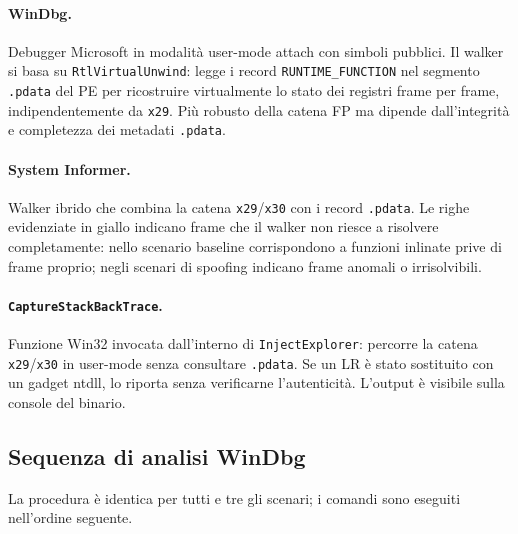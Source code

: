 \paragraph{WinDbg.}
Debugger Microsoft in modalità user-mode attach con simboli pubblici.
Il walker si basa su \texttt{RtlVirtualUnwind}: legge i record
\texttt{RUNTIME\_FUNCTION} nel segmento \texttt{.pdata} del PE per ricostruire
virtualmente lo stato dei registri frame per frame, indipendentemente da
\texttt{x29}. Più robusto della catena FP ma dipende dall'integrità e
completezza dei metadati \texttt{.pdata}.

\paragraph{System Informer.}
Walker ibrido che combina la catena \texttt{x29}/\texttt{x30} con i record
\texttt{.pdata}. Le righe evidenziate in giallo indicano frame che il walker
non riesce a risolvere completamente: nello scenario baseline corrispondono a
funzioni inlinate prive di frame proprio; negli scenari di spoofing indicano
frame anomali o irrisolvibili.

\paragraph{\texttt{CaptureStackBackTrace}.}
Funzione Win32 invocata dall'interno di \texttt{InjectExplorer}: percorre la
catena \texttt{x29}/\texttt{x30} in user-mode senza consultare \texttt{.pdata}.
Se un LR è stato sostituito con un gadget ntdll, lo riporta senza verificarne
l'autenticità. L'output è visibile sulla console del binario.

\subsection*{Sequenza di analisi WinDbg}

La procedura è identica per tutti e tre gli scenari; i comandi sono
eseguiti nell'ordine seguente.

